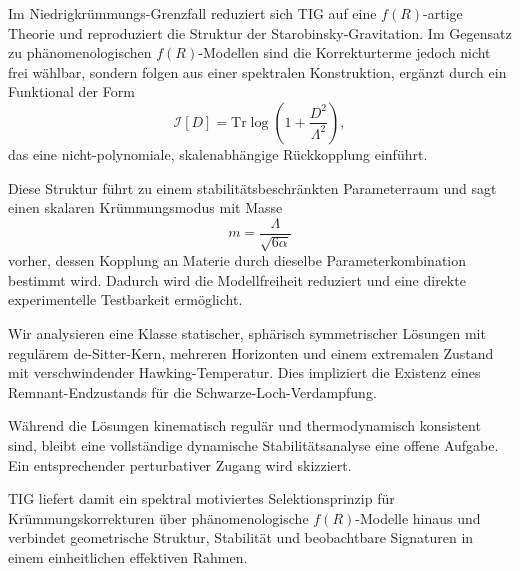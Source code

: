 Im Niedrigkrümmungs-Grenzfall reduziert sich TIG auf eine \(f(R)\)-artige Theorie und reproduziert die Struktur der Starobinsky-Gravitation. Im Gegensatz zu phänomenologischen \(f(R)\)-Modellen sind die Korrekturterme jedoch nicht frei wählbar, sondern folgen aus einer spektralen Konstruktion, ergänzt durch ein Funktional der Form
\[
\mathcal{I}[D] = \mathrm{Tr}\log\left(1 + \frac{D^2}{\Lambda^2}\right),
\]
das eine nicht-polynomiale, skalenabhängige Rückkopplung einführt.

Diese Struktur führt zu einem stabilitätsbeschränkten Parameterraum und sagt einen skalaren Krümmungsmodus mit Masse
\[
m = \frac{\Lambda}{\sqrt{6\alpha}}
\]
vorher, dessen Kopplung an Materie durch dieselbe Parameterkombination bestimmt wird. Dadurch wird die Modellfreiheit reduziert und eine direkte experimentelle Testbarkeit ermöglicht.

Wir analysieren eine Klasse statischer, sphärisch symmetrischer Lösungen mit regulärem de-Sitter-Kern, mehreren Horizonten und einem extremalen Zustand mit verschwindender Hawking-Temperatur. Dies impliziert die Existenz eines Remnant-Endzustands für die Schwarze-Loch-Verdampfung.

Während die Lösungen kinematisch regulär und thermodynamisch konsistent sind, bleibt eine vollständige dynamische Stabilitätsanalyse eine offene Aufgabe. Ein entsprechender perturbativer Zugang wird skizziert.

TIG liefert damit ein spektral motiviertes Selektionsprinzip für Krümmungskorrekturen über phänomenologische \(f(R)\)-Modelle hinaus und verbindet geometrische Struktur, Stabilität und beobachtbare Signaturen in einem einheitlichen effektiven Rahmen.
